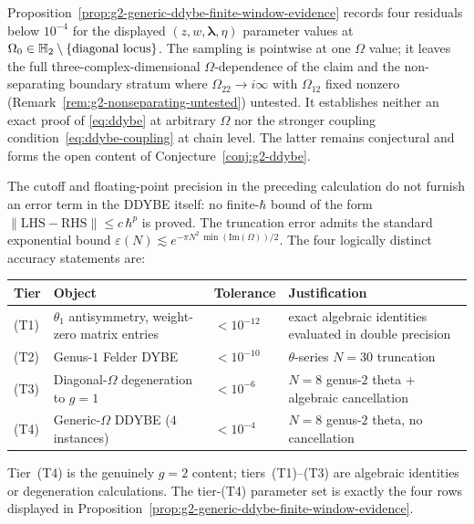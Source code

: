 \begin{remark}
\label{rem:g2p-regime-ii-scope}
Proposition~\ref{prop:g2-generic-ddybe-finite-window-evidence}
records four residuals below $10^{-4}$ for the displayed
$(z,w,\boldsymbol\lambda,\eta)$ parameter values at
$\Omega_0\in\mathbb{H}_2\setminus\{\text{diagonal locus}\}$.
The sampling is pointwise at one $\Omega$ value;
it leaves the full three-complex-dimensional
$\Omega$-dependence of the claim and the
non-separating boundary stratum where $\Omega_{22}\to
i\infty$ with $\Omega_{12}$ fixed nonzero
(Remark~\ref{rem:g2-nonseparating-untested}) untested. It establishes
neither an exact proof of \eqref{eq:ddybe} at
arbitrary $\Omega$ nor the stronger coupling
condition~\eqref{eq:ddybe-coupling} at chain level. The
latter remains conjectural and forms the open content of
Conjecture~\ref{conj:g2-ddybe}.
\end{remark}

\begin{remark}
\label{rem:tolerance-ladder}
The cutoff and floating-point precision in the preceding calculation
do not furnish an error term in the DDYBE itself: no finite-$\hbar$
bound of the form
$\|\mathrm{LHS}-\mathrm{RHS}\| \le c\,\hbar^p$ is proved.
The truncation error admits the standard exponential bound
$\varepsilon(N) \lesssim e^{-\pi N^2\,\min(\mathrm{Im}(\Omega))/2}$.
The four logically distinct accuracy statements are:
\begin{center}
\renewcommand{\arraystretch}{1.2}
\begin{tabular}{@{}llll@{}}
 \toprule
 Tier & Object & Tolerance & Justification \\
 \midrule
 (T1) & $\theta_1$ antisymmetry,
 weight-zero matrix entries
 & $<10^{-12}$ & exact algebraic identities evaluated in double precision \\
 (T2) & Genus-$1$ Felder DYBE
 & $<10^{-10}$ & $\theta$-series $N=30$ truncation \\
 (T3) & Diagonal-$\Omega$ degeneration to $g=1$
 & $<10^{-6}$ & $N=8$ genus-$2$ theta + algebraic cancellation \\
 (T4) & Generic-$\Omega$ DDYBE ($4$ instances)
 & $<10^{-4}$ & $N=8$ genus-$2$ theta, no cancellation \\
 \bottomrule
\end{tabular}
\end{center}
Tier~(T4) is the genuinely $g=2$ content; tiers~(T1)--(T3)
are algebraic identities or degeneration calculations.  The tier-(T4)
parameter set is exactly the four rows displayed in
Proposition~\ref{prop:g2-generic-ddybe-finite-window-evidence}.
\end{remark}

